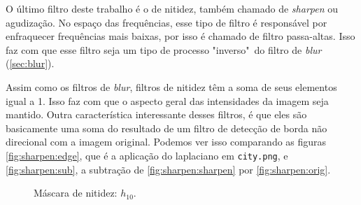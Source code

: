 O último filtro deste trabalho é o de nitidez, também chamado de \textit{sharpen} ou agudização. No espaço das frequências, esse tipo de filtro é responsável por enfraquecer frequências mais baixas, por isso é chamado de filtro passa-altas. Isso faz com que esse filtro seja um tipo de processo "inverso"\ do filtro de \textit{blur} (\cref{sec:blur}).

Assim como os filtros de \textit{blur}, filtros de nitidez têm a soma de seus elementos igual a 1. Isso faz com que o aspecto geral das intensidades da imagem seja mantido. Outra característica interessante desses filtros, é que eles são basicamente uma soma do resultado de um filtro de detecção de borda não direcional com a imagem original. Podemos ver isso comparando as figuras \ref{fig:sharpen:edge}, que é a aplicação do laplaciano em \texttt{city.png}, e \ref{fig:sharpen:sub}, a subtração de \cref{fig:sharpen:sharpen} por \ref{fig:sharpen:orig}.

\begin{figure}[H]
    \centering
    

    \caption{Máscara de nitidez: $h_{10}$.}
    \label{fig:h10}
\end{figure}

